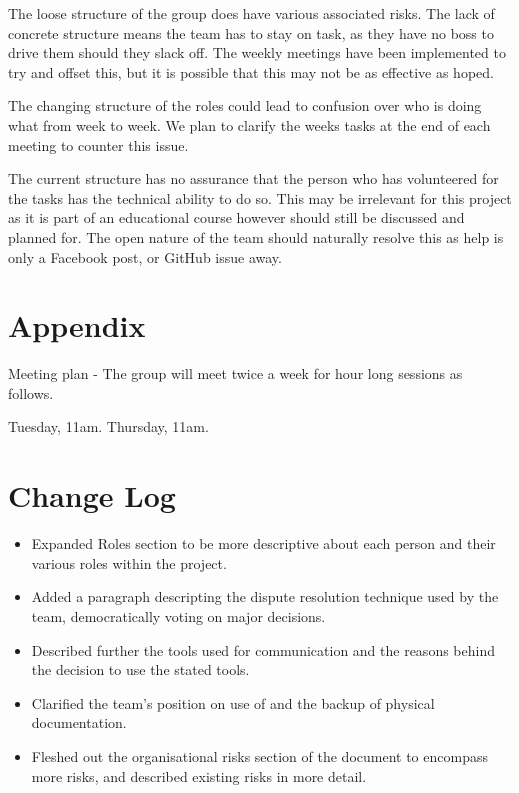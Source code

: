 \documentclass{l3deliverable}
\begin{document}
The loose structure of the group does have various associated risks. The
lack of concrete structure means the team has to stay on task, as they
have no boss to drive them should they slack off. The weekly meetings
have been implemented to try and offset this, but it is possible that this
may not be as effective as hoped.

The changing structure of the roles could lead to confusion over who is
doing what from week to week. We plan to clarify the weeks tasks at the
end of each meeting to counter this issue.

The current structure has no assurance that the person who has volunteered
for the tasks has the technical ability to do so. This may be irrelevant
for this project as it is part of an educational course however should still
be discussed and planned for. The open nature of the team should naturally
resolve this as help is only a Facebook post, or GitHub issue away.

\pagebreak

\appendix

\section{Appendix}

Meeting plan - The group will meet twice a week for hour long sessions as follows.

Tuesday, 11am. Thursday, 11am.

\section{Change Log}

\begin{itemize}

\item Expanded Roles section to be more descriptive about each person and
their various roles within the project.

\item Added a paragraph descripting the dispute resolution technique used by
the team, democratically voting on major decisions.

\item Described further the tools used for communication and the reasons
behind the decision to use the stated tools.

\item Clarified the team's position on use of and the backup of physical
documentation.

\item Fleshed out the organisational risks section of the document to
encompass more risks, and described existing risks in more detail.

\end{itemize}
\end{document}
